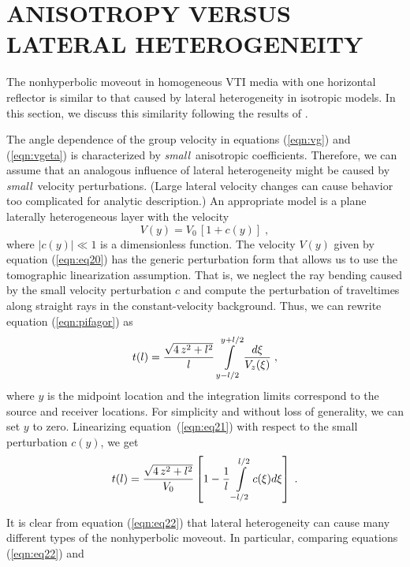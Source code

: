 \section{ANISOTROPY VERSUS LATERAL HETEROGENEITY}
The nonhyperbolic moveout in homogeneous VTI media with one horizontal reflector
is similar to that caused by lateral heterogeneity in isotropic models.
In this section, we discuss this similarity following the results of 
\cite{GEO63-01-02040212}.
\par
The angle dependence of the group velocity in equations (\ref{eqn:vg})
and (\ref{eqn:vgeta}) is characterized by {\em small}$\,$ anisotropic
coefficients. Therefore, we can assume that an analogous influence of
lateral heterogeneity might be caused by {\em small}$\,$ velocity
perturbations. (Large lateral velocity changes can cause behavior too
complicated for analytic description.) An appropriate model is a plane
laterally heterogeneous layer with the velocity
\begin{equation} 
V(y) = V_0\,\left[ 1 + c(y) \right]\;, 
\label{eqn:eq20} 
\end{equation} 
where $|c(y)| \ll 1$ is a dimensionless function.  The velocity $V(y)$
given by equation (\ref{eqn:eq20}) has the generic perturbation
form that allows us to use the tomographic linearization assumption.
That is, we neglect the ray bending caused by the small velocity
perturbation $c$ and compute the perturbation of traveltimes along
straight rays in the constant-velocity background. Thus, we can rewrite
equation (\ref{eqn:pifagor}) as
\begin{equation}
  t(l) = {\sqrt{4\,z^2 + l^2} \over {l}}\,\int\limits_{y-l/2}^{y+l/2}{ d\xi
    \over V_z(\xi) }\;,
\label{eqn:eq21}
\end{equation}
where $y$ is the midpoint location and the integration limits correspond
to the source and receiver locations. For simplicity and without loss
of generality, we can set $y$ to zero. Linearizing equation~(\ref{eqn:eq21})
with respect to the small perturbation $c(y)$, we get
\begin{equation}
t(l) = { \sqrt{4\,z^2 + l^2} \over V_0 } \left[ 1 - {1 \over {l}}
        \int\limits_{-l/2}^{l/2} c(\xi) d\xi \right]\;.
\label{eqn:eq22}
\end{equation}
\par
It is clear from equation (\ref{eqn:eq22}) that lateral
heterogeneity can cause many different types of the nonhyperbolic moveout.
In particular, comparing equations (\ref{eqn:eq22}) and
